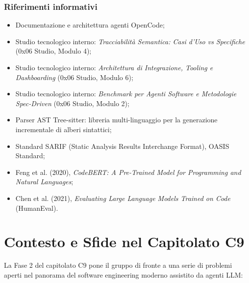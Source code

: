 \documentclass[a4paper, 11pt]{article}
\begin{document}
\subsubsection{Riferimenti informativi}
\begin{itemize}[noitemsep]
    \item Documentazione e architettura agenti OpenCode;
    \item Studio tecnologico interno: \textit{Tracciabilità Semantica: Casi d'Uso vs Specifiche} (0x06 Studio, Modulo 4);
    \item Studio tecnologico interno: \textit{Architettura di Integrazione, Tooling e Dashboarding} (0x06 Studio, Modulo 6);
    \item Studio tecnologico interno: \textit{Benchmark per Agenti Software e Metodologie Spec-Driven} (0x06 Studio, Modulo 2);
    \item Parser AST Tree-sitter: libreria multi-linguaggio per la generazione incrementale di alberi sintattici;
    \item Standard SARIF (Static Analysis Results Interchange Format), OASIS Standard;
    \item Feng et al. (2020), \textit{CodeBERT: A Pre-Trained Model for Programming and Natural Languages};
    \item Chen et al. (2021), \textit{Evaluating Large Language Models Trained on Code} (HumanEval).
\end{itemize}


\section{Contesto e Sfide nel Capitolato C9}
La Fase 2 del capitolato C9 pone il gruppo di fronte a una serie di problemi aperti nel panorama del software engineering moderno assistito da agenti LLM:
\end{document}
